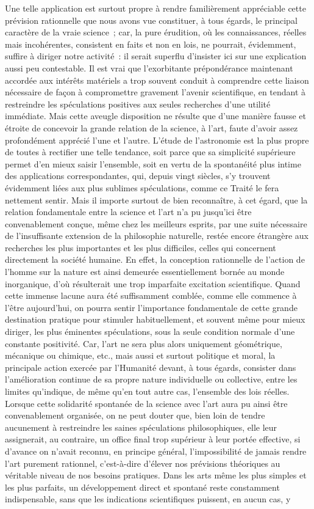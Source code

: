 \documentclass[french,twoside]{book} %
\begin{document}
Une telle application est surtout propre à rendre familièrement appréciable cette prévision rationnelle que nous avons vue constituer, à tous égards, le principal caractère de la vraie science ; car, la pure érudition, où les connaissances, réelles mais incohérentes, consistent en faits et non en lois, ne pourrait, évidemment, suffire à diriger notre activité : il serait superflu d’insister ici sur une explication aussi peu contestable. Il est vrai que l’exorbitante prépondérance maintenant accordée aux intérêts matériels a trop souvent conduit à comprendre cette liaison nécessaire de façon à compromettre gravement l’avenir scientifique, en tendant à restreindre les spéculations positives aux seules recherches d’une utilité immédiate. Mais cette aveugle disposition ne résulte que d’une manière fausse et étroite de concevoir la grande relation de la science, à l’art, faute d’avoir assez profondément apprécié l’une et l’autre. L’étude de l’astronomie est la plus propre de toutes à rectifier une telle tendance, soit parce que sa simplicité supérieure permet d’en mieux saisir l’ensemble, soit en vertu de la spontanéité plus intime des applications correspondantes, qui, depuis vingt siècles, s’y trouvent évidemment liées aux plus sublimes spéculations, comme ce Traité le fera nettement sentir. Mais il importe surtout de bien reconnaître, à cet égard, que la relation fondamentale entre la science et l’art n’a pu jusqu’ici être convenablement conçue, même chez les meilleurs esprits, par une suite nécessaire de l’insuffisante extension de la philosophie naturelle, restée encore étrangère aux recherches les plus importantes et les plus difficiles, celles qui concernent directement la société humaine. En effet, la conception rationnelle de l’action de l’homme sur la nature est ainsi demeurée essentiellement bornée au monde inorganique, d’où résulterait une trop imparfaite excitation scientifique. Quand cette immense lacune aura été suffisamment comblée, comme elle commence à l’être aujourd’hui, on pourra sentir l’importance fondamentale de cette grande destination pratique pour stimuler habituellement, et souvent même pour mieux diriger, les plus éminentes spéculations, sous la seule condition normale d’une constante positivité. Car, l’art ne sera plus alors uniquement géométrique, mécanique ou chimique, etc., mais aussi et surtout politique et moral, la principale action exercée par l’Humanité devant, à tous égards, consister dans l’amélioration continue de sa propre nature individuelle ou collective, entre les limites qu’indique, de même qu’en tout autre cas, l’ensemble des lois réelles. Lorsque cette solidarité spontanée de la science avec l’art aura pu ainsi être convenablement organisée, on ne peut douter que, bien loin de tendre aucunement à restreindre les saines spéculations philosophiques, elle leur assignerait, au contraire, un office final trop supérieur à leur portée effective, si d’avance on n’avait reconnu, en principe général, l’impossibilité de jamais rendre l’art purement rationnel, c’est-à-dire d’élever nos prévisions théoriques au véritable niveau de nos besoins pratiques. Dans les arts même les plus simples et les plus parfaits, un développement direct et spontané reste constamment indispensable, sans que les indications scientifiques puissent, en aucun cas, y 
\end{document}

